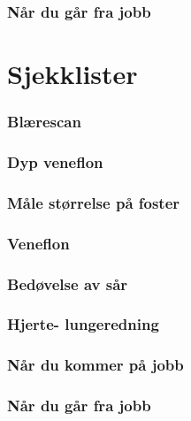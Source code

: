 \documentclass[a4paper,12pt,twoside]{memoir}
\begin{document}
				\section{Når du går fra jobb}
		




	\part{Sjekklister}
		\section{Blærescan}
		\section{Dyp veneflon}
		\section{Måle størrelse på foster}
		\section{Veneflon}
		\section{Bedøvelse av sår}
		\section{Hjerte- lungeredning}
		\section{Når du kommer på jobb}
		\section{Når du går fra jobb}



	{}
	

\backmatter

 
          
	
	
	\listoffigures
	
	\listoftables
\end{document}
